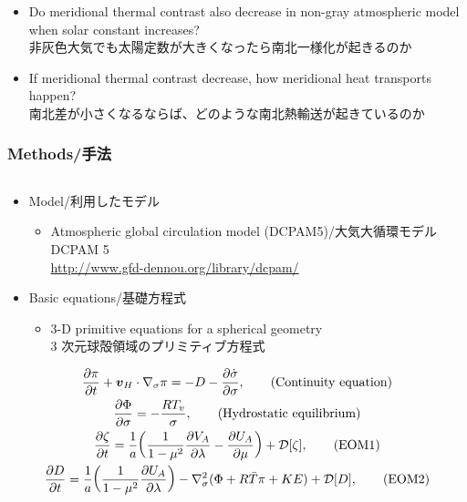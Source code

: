 \documentclass[aspectratio=149,9pt,fleqn,tbtags]{beamer}
\newcommand{\jp}[1]{{\footnotesize #1}}
\begin{document}
\begin{frame}
\begin{itemize}
		\begin{itemize}
			\item Do meridional thermal contrast also decrease
				in non-gray atmospheric model when solar constant increases?\\
				\jp{非灰色大気でも太陽定数が大きくなったら南北一様化が起きるのか}
			\item If meridional thermal contrast decrease,
				how meridional heat transports happen?\\
				\jp{南北差が小さくなるならば、どのような南北熱輸送が起きているのか}
		\end{itemize}
	\end{itemize}
\end{frame}

\begin{frame}
	\frametitle{Methods/手法}
	\small
	\begin{columns}
		\begin{column}{.55\textwidth}
			\begin{itemize}
				\item Model/利用したモデル
					\begin{itemize}
						\item Atmospheric global circulation model (DCPAM5)/大気大循環モデル DCPAM 5\\
							{\footnotesize\url{http://www.gfd-dennou.org/library/dcpam/}}
					\end{itemize}
				\item Basic equations/基礎方程式
					\begin{itemize}
						\item 3-D primitive equations for a spherical geometry\\
							\jp{3 次元球殻領域のプリミティブ方程式}
					\end{itemize}
			\end{itemize}
			\tiny
			\begin{gather}
				\pdv{\pi}{t}+\vb*{v}_H\cdot\nabla_\sigma\pi=-D-\pdv{\dot \sigma}{\sigma},\tag{Continuity equation}\\
				\pdv{\Phi}{\sigma}=-\frac{RT_v}{\sigma},\tag{Hydrostatic equilibrium}\\
				\pdv{\zeta}{t}=\frac{1}{a}\qty(\frac{1}{1-\mu^2}\pdv{V_A}{\lambda}
					-\pdv{U_A}{\mu})+\mathcal{D}[\zeta],\tag{EOM1}\\
				\pdv{D}{t}=\frac{1}{a}\qty(\frac{1}{1-\mu^2}\pdv{U_A}{\lambda})
				-\nabla^2_\sigma(\Phi+R\bar T\pi+KE)+\mathcal{D}[D],\tag{EOM2}\\
				\begin{split}

\end{split}
\end{gather}
\end{column}
\end{columns}
\end{frame}
\end{document}
